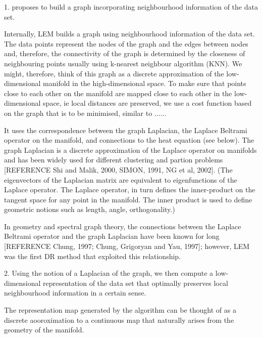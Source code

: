 \documentclass[journal, a4paper]{IEEEtran}
\begin{document}

1. proposes to build a graph incorporating neighbourhood information of the data set.


Internally, LEM builds a graph using neighbourhood information of the data set. The data points represent the nodes of the graph and the edges between nodes and, therefore, the connectivity of the graph is determined by the closeness of neighbouring points usually using k-nearest neighbour algorithm (KNN). We might, therefore, think of this graph as a discrete approximation of the low-dimensional manifold in the high-dimensional space. 
To make sure that points close to each other on the manifold are mapped close to each other in the low-dimensional space, ie local distances are preserved, we use a cost function based on the graph that is to be minimised, similar to ......

It uses the correspondence between the graph Laplacian, the Laplace Beltrami operator on the manifold, and connections to the heat equation (see below). The graph Laplacian is a discrete approximation of the Laplace operator on manifolds and has been widely used for different clustering and partion problems [REFERENCE Shi and Malik, 2000, SIMON, 1991, NG et al, 2002]. (The eigenvectors of the Laplacian matrix are equivalent to eigenfunctions of the Laplace operator. The Laplace operator, in turn defines the inner-product on the tangent space for any point in the manifold. The inner product is used to define geometric notions such as length, angle, orthogonality.)

In geometry and spectral graph theory, the connections between the Laplace Beltrami operator and the graph Laplacian have been known for long [REFERENCE Chung, 1997; Chung, Grigoryan and Yau, 1997]; however, LEM was the first DR method that exploited this relationship. 

2. Using the notion of a Laplacian of the graph, we then compute a low-dimensional representation of the data set that optimally preserves local neighbourhood information in a certain sense.

The representation map generated by the algorithm can be thought of as a discrete aooroximation to a continuous map that naturally arises from the geometry of the manifold.
\end{document}
